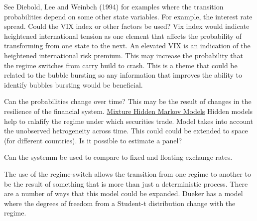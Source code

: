 \documentclass[12pt, a4paper, oneside]{article} %
\begin{document}


See Diebold, Lee and Weinbch (1994) for examples where the transition probabilities depend on some other state variables.  For example, the interest rate spread.   Could the VIX index or other factors be used?  Vix index would indicate heightened international tension as one element that affects the probability of transforming from one state to the next.  An elevated VIX is an indication of the heightened international risk premium.  This may increase the probability that the regime switches from carry build to crash.  This is a theme that could be related to the bubble bursting so any information that improves the ability to identify bubbles bursting would be beneficial.  



Can the probabilities change over time?  This may be the result of changes in the resilience of the financial system. 
\href{http://members.home.nl/jeroenvermunt/dias2010.pdf}{Mixture Hidden Markov Models} Hidden models help to calafify the regime under which securities trade. Model takes into account the unobserved hetrogeneity across time. This could could be extended to space (for different countries).  Is it possible to estimate a panel? 

Can the systemm be used to compare to fixed and floating exchange rates. 

The use of the regime-switch allows the transition from one regime to another to be the result of something that is more than just a deterministic process. There are a number of ways that this model could be expanded.  Dueker has a model where the degrees of freedom from a Student-t distribution change with the regime.  
\end{document}
